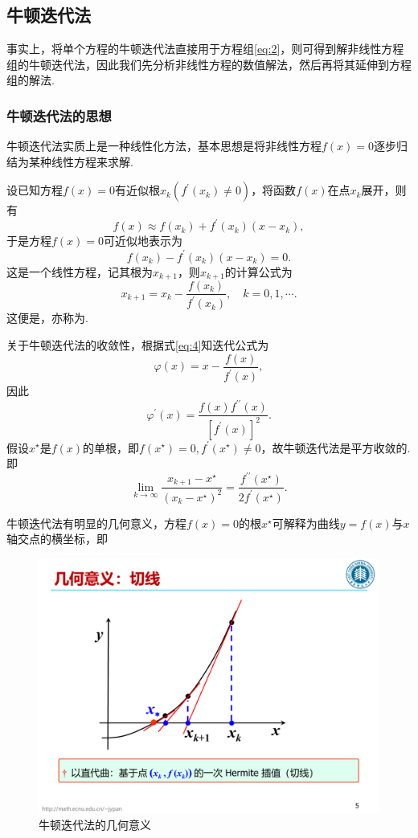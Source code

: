 \documentclass[cn,12pt,founder,a4paper]{elegantpaper}
\newcommand*{\douprime}{{\prime\prime}}
\renewcommand*{\emph}[1]{{\heiti{#1}}}
\begin{document}
\subsection{牛顿迭代法}
事实上，将单个方程的牛顿迭代法直接用于方程组\eqref{eq:2}，则可得到解非线性方程组的牛顿迭代法，因此我们先分析非线性方程的数值解法，然后再将其延伸到方程组的解法.

\subsubsection{牛顿迭代法的思想}
牛顿迭代法实质上是一种线性化方法，基本思想是将非线性方程\(f(x)=0\)逐步归结为某种线性方程来求解.\par
设已知方程\(f(x)=0\)有近似根\(x_k(f^\prime(x_k)\ne 0)\)，将函数\(f(x)\)在点\(x_k\)展开，则有
\[f(x)\approx f(x_k)+f^\prime(x_k)(x-x_k),\]
于是方程\(f(x)=0\)可近似地表示为
\[f(x_k)-f^\prime(x_k)(x-x_k)=0.\]
这是一个线性方程，记其根为\(x_{k+1}\)，则\(x_{k+1}\)的计算公式为
\begin{equation}\label{eq:4}
  x_{k+1}=x_k-\frac{f(x_k)}{f^\prime(x_k)},\quad k=0,1,\cdots.
\end{equation}
这便是\emph{牛顿迭代法}，亦称为\emph{切线法}.\par
关于牛顿迭代法的收敛性，根据式\eqref{eq:4}知迭代公式为
\[\varphi(x)=x-\frac{f(x)}{f^\prime(x)},\]
因此
\[\varphi^\prime(x)=\frac{f(x)f^\douprime(x)}{[f^\prime(x)]^2}.\]
假设\(x^\star\)是\(f(x)\)的单根，即\(f(x^\star)=0,f^\prime(x^\star)\ne 0\)，故牛顿迭代法是平方收敛的. 即
\[\lim_{k\to\infty}\frac{x_{k+1}-x^\star}{(x_k-x^\star)^2}=\frac{f^\douprime(x^\star)}{2f^\prime(x^\star)}.\]\par
牛顿迭代法有明显的几何意义，方程\(f(x)=0\)的根\(x^\star\)可解释为曲线\(y=f(x)\)与\(x\)轴交点的横坐标，即
\begin{figure}[h]
  \centering
  \includegraphics[scale=0.55]{image/Newton.pdf}
  \caption{牛顿迭代法的几何意义}
\end{figure}
\end{document}
